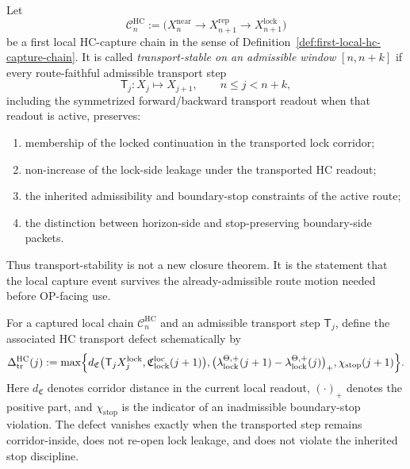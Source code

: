 \begin{definition}
\label{def:transport-stable-hc-capture-chain}
Let
\[
 \mathcal C_{n}^{\mathrm{HC}}
 :=
 \bigl(
 X_n^{\mathrm{near}}
 \to
 X_{n+1}^{\mathrm{rep}}
 \to
 X_{n+1}^{\mathrm{lock}}
 \bigr)
\]
be a first local HC-capture chain in the sense of Definition~\ref{def:first-local-hc-capture-chain}. It is called
\emph{transport-stable on an admissible window} $[n,n+k]$ if every route-faithful admissible transport step
\[
 \mathsf T_j:X_j\longmapsto X_{j+1},
 \qquad n\leq j<n+k,
\]
including the symmetrized forward/backward transport readout when that readout is active, preserves:
\begin{enumerate}[leftmargin=2em,label=(\alph*)]
 \item membership of the locked continuation in the transported lock corridor;
 \item non-increase of the lock-side leakage under the transported HC readout;
 \item the inherited admissibility and boundary-stop constraints of the active route;
 \item the distinction between horizon-side and stop-preserving boundary-side packets.
\end{enumerate}
Thus transport-stability is not a new closure theorem. It is the statement that the local capture event survives the already-admissible route motion needed before OP-facing use.
\end{definition}

\begin{definition}
\label{def:hc-transport-defect}
For a captured local chain $\mathcal C_n^{\mathrm{HC}}$ and an admissible transport step $\mathsf T_j$, define the associated HC transport defect schematically by
\[
 \Delta_{\mathrm{tr}}^{\mathrm{HC}}(j)
 :=
 \max\Bigl\{
 d_{\mathfrak C}\bigl(\mathsf T_j X_{j}^{\mathrm{lock}},\mathfrak C_{\mathrm{lock}}^{\mathrm{loc}}(j+1)\bigr),
 \bigl(\lambda_{\mathrm{lock}}^{\Theta,+}(j+1)-\lambda_{\mathrm{lock}}^{\Theta,+}(j)\bigr)_{+},
 \chi_{\mathrm{stop}}(j+1)
 \Bigr\}.
\]
Here $d_{\mathfrak C}$ denotes corridor distance in the current local readout, $(\cdot)_+$ denotes the positive part, and $\chi_{\mathrm{stop}}$ is the indicator of an inadmissible boundary-stop violation. The defect vanishes exactly when the transported step remains corridor-inside, does not re-open lock leakage, and does not violate the inherited stop discipline.
\end{definition}

